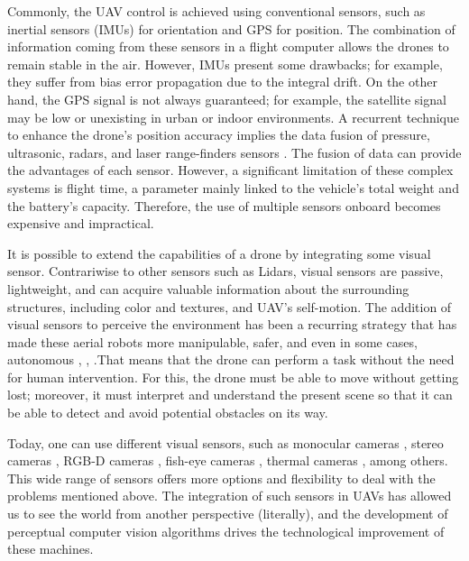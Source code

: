 Commonly, the UAV control is achieved using conventional sensors, such as inertial sensors (IMUs) for orientation and GPS for position. The combination of information coming from these sensors in a flight computer allows the drones to remain stable in the air. However, IMUs present some drawbacks; for example, they suffer from bias error propagation due to the integral drift. On the other hand, the GPS signal is not always guaranteed; for example, the satellite signal may be low or unexisting in urban or indoor environments. A recurrent technique to enhance the drone's position accuracy implies the data fusion of pressure, ultrasonic, radars, and laser range-finders sensors \citep{Tomic.Schmid.ea:IRAM:2012}. The fusion of data can provide the advantages of each sensor. However, a significant limitation of these complex systems is flight time, a parameter mainly linked to the vehicle's total weight and the battery's capacity. Therefore, the use of multiple sensors onboard becomes expensive and impractical.

It is possible to extend the capabilities of a drone by integrating some visual sensor. Contrariwise to other sensors such as Lidars, visual sensors are passive, lightweight, and can acquire valuable information about the surrounding structures, including color and textures, and UAV's self-motion. The addition of visual sensors to perceive the environment has been a recurring strategy that has made these aerial robots more manipulable, safer, and even in some cases, autonomous \citep{He.Qiao.ea:CM:2018}, \citep{Kyrkou.Timotheou.ea:POT:2019}, \citep{Zhu.Wen.ea:arXiv:2020}.That means that the drone can perform a task without the need for human intervention. For this, the drone must be able to move without getting lost; moreover, it must interpret and understand the present scene so that it can be able to detect and avoid potential obstacles on its way. 

Today, one can use different visual sensors, such as monocular cameras \citep{Padhy.Xia.ea:TSC:2018}, stereo cameras \citep{Seitz.Curless.ea:CVPR:2006}, RGB-D cameras \citep{Huang.Bachrach.ea:RobR:2017}, fish-eye cameras \citep{Hrabar.Sukhatme:IROS:2004}, thermal cameras \citep{Gaszczak.Breckon.ea:IRCV:2011}, among others. This wide range of sensors offers more options and flexibility to deal with the problems mentioned above. The integration of such sensors in UAVs has allowed us to see the world from another perspective (literally), and the development of perceptual computer vision algorithms drives the technological improvement of these machines.

